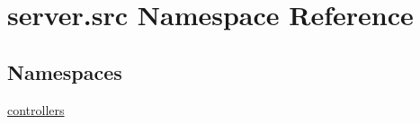 \hypertarget{namespaceserver_1_1src}{}\section{server.\+src Namespace Reference}
\label{namespaceserver_1_1src}
\subsection*{Namespaces}
\begin{DoxyCompactItemize}
\item 
 \hyperlink{namespaceserver_1_1src_1_1controllers}{controllers}
\end{DoxyCompactItemize}
